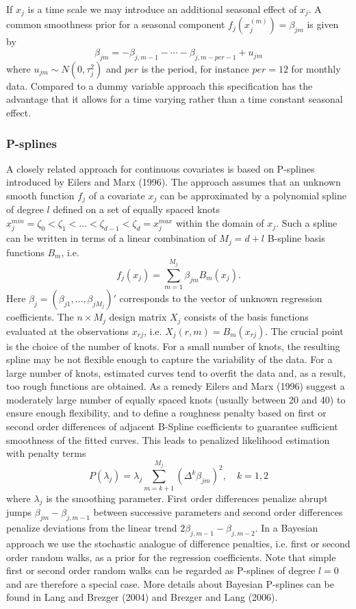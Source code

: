 \documentclass[11pt,a4paper,twoside]{bayesxarticle}
\begin{document}
If $x_j$ is a time  scale we may introduce an additional seasonal
effect of $x_j$. A common smoothness prior for a seasonal
component $f_j(x_j^{(m)}) = \beta_{jm}$ is given by
\begin{equation}
\beta_{jm} = -\beta_{j,m-1} - \cdots -
\beta_{j,m-per-1}+u_{jm}\label{seasonal}
\end{equation}
where $u_{jm}\sim N(0,\tau_j^{2})$ and $per$ is the period, for
instance $per = 12$ for monthly data. Compared to a dummy variable
approach this specification has the advantage that it allows for a
time varying rather than a time constant seasonal effect.


\subsubsection{P-splines}

A closely related approach for continuous covariates is based on
P-splines introduced by Eilers and Marx (1996). The approach
assumes that an unknown smooth function $f_j$ of a covariate $x_j$
can be approximated by a polynomial spline of degree $l$ defined
on a set of equally spaced knots $x_j^{min} = \zeta_{0}  <
\zeta_{1} < \dots < \zeta_{d-1} < \zeta_{d} = x_j^{max}$ within
the domain of $x_j$. Such a spline can be written in terms of a
linear combination of $M_j = d+l$ B-spline basis functions
$B_{m}$, i.e.
$$
f_j(x_j) = \sum_{m=1}^{M_j} \beta_{jm} B_{m}(x_j).
$$
Here $\beta_j = (\beta_{j1},\dots,\beta_{jM_j})'$ corresponds to
the vector of unknown regression coefficients. The $n \times M_j$
design matrix $X_j$ consists of the basis functions evaluated at
the observations $x_{rj}$, i.e. $X_j(r,m) = B_m(x_{rj})$. The
crucial point is the choice of the number of knots. For a small
number of knots, the resulting spline may be not flexible enough
to capture the variability of the data. For a large number of
knots, estimated curves tend to overfit the data and, as a result,
too rough functions are obtained. As a remedy Eilers and Marx
(1996) suggest a moderately large number of equally spaced knots
(usually between 20 and 40) to ensure enough flexibility, and to
define a roughness penalty based on first or second order
differences of adjacent B-Spline coefficients to guarantee
sufficient smoothness of the fitted curves. This leads to
penalized likelihood estimation with penalty terms
\begin{equation}
\label{diffpenalty} P(\lambda_j) = \lambda_j \sum_{m=k+1}^{M_j}
(\Delta^k \beta_{jm})^2 , \quad k=1,2
\end{equation}
where $\lambda_j$ is the smoothing parameter. First order
differences penalize abrupt jumps $\beta_{jm}-\beta_{j,m-1}$ between
successive parameters and second order differences penalize
deviations from the linear trend $2 \beta_{j,m-1}-\beta_{j,m-2}$. In
a Bayesian approach we use the stochastic analogue of difference
penalties, i.e. first or second order random walks, as a prior for
the regression coefficients. Note that simple first or second order
random walks can be regarded as P-splines of degree $l=0$ and are
therefore a special case. More details about Bayesian P-splines can
be found in Lang and Brezger (2004) and Brezger and Lang (2006).
\end{document}
